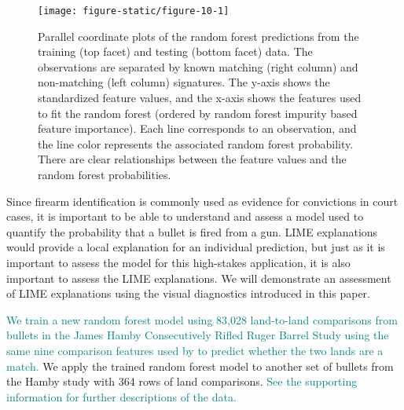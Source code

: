 \documentclass[AMS,STIX2COL]{WileyNJD-v2}\usepackage[]{graphicx}\usepackage[]{color}
\newenvironment{knitrout}{}{} %
\newcommand{\kge}[1]{\textcolor{teal}{#1}}
\begin{document}
\begin{figure}[!thp]
\begin{knitrout}
\color{fgcolor}

{\centering \texttt{[image: figure-static/figure-10-1]} 

}



\end{knitrout}
\caption{Parallel coordinate plots of the \citet{hare:2017} random forest predictions from the training (top facet) and testing (bottom facet) data. The observations are separated by known matching (right column) and non-matching (left column) signatures. The y-axis shows the standardized feature values, and the x-axis shows the features used to fit the random forest (ordered by random forest impurity based feature importance). Each line corresponds to an observation, and the line color represents the associated random forest probability. There are clear relationships between the feature values and the random forest probabilities.}
\label{fig:figure-10}
\end{figure}

Since firearm identification is commonly used as evidence for convictions in court cases, it is important to be able to understand and assess a model used to quantify the probability that a bullet is fired from a gun. LIME explanations would provide a local explanation for an individual prediction, but just as it is important to assess the model for this high-stakes application, it is also important to assess the LIME explanations. We will demonstrate an assessment of LIME explanations using the visual diagnostics introduced in this paper.

\kge{We train a new random forest model using 83,028 land-to-land comparisons from bullets in the James Hamby Consecutively Rifled Ruger Barrel Study \citep{hamby:2009} using the same nine comparison features used by \citet{hare:2017} to predict whether the two lands are a match.} We apply the trained random forest model to another set of bullets from the Hamby study with 364 rows of land comparisons. \kge{See the supporting information for further descriptions of the data.} 
\end{document}
